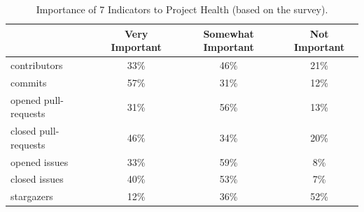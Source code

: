 \documentclass[smallextended]{svjour3}
\begin{document}
\begin{table}[!t]
\centering
\caption{Importance of 7 Indicators to Project Health (based on the survey).}
\label{tbl:survey}
\begin{adjustbox}{max width=0.98\textwidth}
\begin{tabular}{l|c|c|c}
\rowcolor[HTML]{BDBDBD} 
 & Very Important & Somewhat Important & Not Important \\ \hline
\rowcolor[HTML]{FFFFFF} 
contributors & 33\% & 46\% & 21\% \\
\rowcolor[HTML]{F3F3F3} 
commits & 57\% & 31\% & 12\% \\
\rowcolor[HTML]{FFFFFF} 
opened pull-requests & 31\% & 56\% & 13\% \\
\rowcolor[HTML]{F3F3F3} 
closed pull-requests & 46\% & 34\% & 20\% \\
\rowcolor[HTML]{FFFFFF} 
opened issues & 33\% & 59\% & 8\% \\
\rowcolor[HTML]{F3F3F3} 
closed issues & 40\% & 53\% & 7\% \\
\rowcolor[HTML]{FFFFFF} 
stargazers & 12\% & 36\% & 52\%
\end{tabular}
\end{adjustbox}
\end{table}
 
\end{document}
